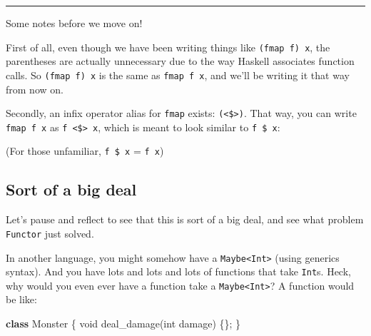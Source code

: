 \documentclass[]{article}
\newenvironment{Shaded}{}{}
\newcommand{\KeywordTok}[1]{\textcolor[rgb]{0.00,0.44,0.13}{\textbf{{#1}}}}
\newcommand{\DataTypeTok}[1]{\textcolor[rgb]{0.56,0.13,0.00}{{#1}}}
\newcommand{\DecValTok}[1]{\textcolor[rgb]{0.25,0.63,0.44}{{#1}}}
\newcommand{\FunctionTok}[1]{\textcolor[rgb]{0.02,0.16,0.49}{{#1}}}
\newcommand{\NormalTok}[1]{{#1}}
\begin{document}
\begin{center}\rule{0.5\linewidth}{\linethickness}\end{center}

Some notes before we move on!

First of all, even though we have been writing things like
\texttt{(fmap\ f)\ x}, the parentheses are actually unnecessary due to
the way Haskell associates function calls. So \texttt{(fmap\ f)\ x} is
the same as \texttt{fmap\ f\ x}, and we'll be writing it that way from
now on.

Secondly, an infix operator alias for \texttt{fmap} exists:
\texttt{(\textless{}\$\textgreater{})}. That way, you can write
\texttt{fmap\ f\ x} as \texttt{f\ \textless{}\$\textgreater{}\ x}, which
is meant to look similar to \texttt{f\ \$\ x}:

\begin{Shaded}
\end{Shaded}

(For those unfamiliar, \texttt{f\ \$\ x} = \texttt{f\ x})

\subsection{Sort of a big deal}\label{sort-of-a-big-deal}

Let's pause and reflect to see that this is sort of a big deal, and see
what problem \texttt{Functor} just solved.

In another language, you might somehow have a
\texttt{Maybe\textless{}Int\textgreater{}} (using generics syntax). And
you have lots and lots and lots of functions that take \texttt{Int}s.
Heck, why would you even ever have a function take a
\texttt{Maybe\textless{}Int\textgreater{}}? A function would be like:

\begin{Shaded}
\begin{Highlighting}[]
\KeywordTok{class} \NormalTok{Monster \{}
    \DataTypeTok{void} \FunctionTok{deal_damage}\NormalTok{(}\DataTypeTok{int} \NormalTok{damage) \{\};}
\NormalTok{\}}
\end{Highlighting}
\end{Shaded}
\end{document}
